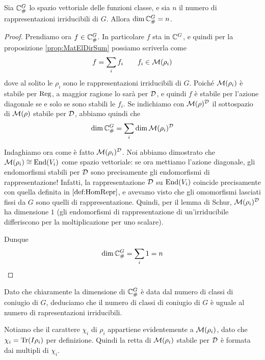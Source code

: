 		\begin{myprop}
			Sia $\mathbb C^{G}_\#$ lo spazio vettoriale delle funzioni classe, e sia $n$ il numero di rappresentazioni irriducibili di $G$. Allora $\dim \mathbb C^{G}_\# = n$.
		\end{myprop}
		\begin{proof}
			
			Prendiamo ora $f\in \mathbb C^{G}_\#$. In particolare $f$ sta in $\mathbb C^{G}$, e quindi per la proposizione \ref{prop:MatElDirSum} possiamo scriverla come
			\[
			f= \sum_i f_i\qquad f_i \in \mathcal M(\rho_i)
			\]
			dove al solito le $\rho_i$ sono le rappresentazioni irriducibili di $G$. Poiché $\mathcal M(\rho_i)$ è stabile per $\operatorname{Reg}$, a maggior ragione lo sarà per $\mathcal D$, e quindi $f$ è stabile per l'azione diagonale se e solo se sono stabili le $f_i$. Se indichiamo con $\mathcal M(\rho)^\mathcal D$ il sottospazio di $\mathcal M(\rho)$ stabile per $\mathcal D$, abbiamo quindi che
			\[
				\dim \mathbb C^{G}_\# = \sum_i \dim \mathcal M(\rho_i)^\mathcal D
			\]
			
			Indaghiamo ora come è fatto $\mathcal M(\rho_i)^\mathcal D$. Noi abbiamo dimostrato che $\mathcal M(\rho_i)\cong \operatorname{End}(V_i)$ come spazio vettoriale: se ora mettiamo l'azione diagonale, gli endomorfismi stabili per $\mathcal D$ sono precisamente gli endomorfismi di rappresentazione! Infatti, la rappresentazione $\mathcal D$ su $\operatorname{End}(V_i)$ coincide precisamente con quella definita in $\ref{def:HomRepr}$, e avevamo visto che gli omomorfismi lasciati fissi da $G$ sono quelli di rappresentazione. Quindi, per il lemma di Schur, $\mathcal M(\rho_i)^\mathcal D$ ha dimensione $1$ (gli endomorfismi di rappresentazione di un'irriducibile differiscono per la moltiplicazione per uno scalare).
			
			Dunque
			\[
				\dim \mathbb C^{G}_\# = \sum_i 1 = n
			\]

		\end{proof}
		
		Dato che chiaramente la dimensione di $\mathbb C^{G}_\#$ è data dal numero di classi di coniugio di $G$, deduciamo che il numero di classi di coniugio di $G$ è uguale al numero di rapresentazioni irriducibili.
		
		\begin{myobs}
			Notiamo che il carattere $\chi_i$ di $\rho_i$ appartiene evidentemente a $\mathcal M(\rho_i)$, dato che $\chi_i = \operatorname{Tr}(I\rho_i)$ per definizione. Quindi la retta di $\mathcal M(\rho_i)$ stabile per $\mathcal D$ è formata dai multipli di $\chi_i$.
		\end{myobs}


		
		



	
	



